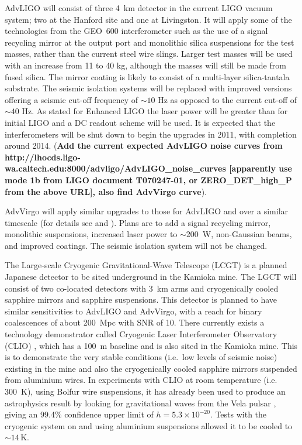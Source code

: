 \documentclass{article}
\begin{document}
AdvLIGO will consist of three 4~km detector in the current LIGO vacuum system;
two at the Hanford site and one at Livingston. It will apply some of the
technologies from the GEO~600 interferometer such as the use of a signal
recycling mirror at the output port and monolithic silica suspensions for the
test masses, rather than the current steel wire slings. Larger test masses will
be used with an increase from 11 to 40 kg, although the masses will still be
made from fused silica. The mirror coating is likely to consist of a
multi-layer silica-tantala substrate. The seismic isolation systems will be
replaced with improved versions offering a seismic cut-off frequency of $\sim10$
Hz as opposed to the current cut-off of $\sim40$ Hz. As stated for Enhanced LIGO
the laser power will be greater than for initial LIGO and a DC readout scheme
will be used. It is expected that the interferometers will be shut down to
begin the upgrades in 2011, with completion around 2014. ({\bf Add the current
expected AdvLIGO noise curves from
http://lhocds.ligo-wa.caltech.edu:8000/advligo/AdvLIGO\_noise\_curves
[apparently
use mode 1b from LIGO document T070247-01, or ZERO\_DET\_high\_P from the above
URL], also find AdvVirgo curve}).

AdvVirgo will apply similar upgrades to those for AdvLIGO and over a similar
timescale (for details see \cite{AdVwhitepaper} and \cite{AdVdesign}). Plans are
to add a signal recycling mirror, monolithic suspensions, increased laser power
to $\sim200$~W, non-Gaussian beams, and improved coatings. The seismic isolation
system will not be changed.

The Large-scale Cryogenic Gravitational-Wave Telescope (LCGT)
\cite{Miyoki:2005, Ohashi:2008} is a planned Japanese detector to be sited
underground in the Kamioka mine. The LGCT will consist of two co-located
detectors with 3~km arms and cryogenically cooled sapphire mirrors and sapphire
suspensions. This detector is planned to have similar sensitivities to AdvLIGO
and AdvVirgo, with a reach for binary coalescences of about 200~Mpc with SNR of
10. There currently exists a technology demonstrator called Cryogenic Laser
Interferometer Observatory (CLIO) \cite{Yamamoto:2008, CLIOweb}, which has a
100~m baseline and is also sited in the Kamioka mine. This is to demonstrate the
very stable conditions (i.e.\ low levels of seismic noise) existing in the mine
and also the cryogenically cooled sapphire mirrors suspended from aluminium
wires. In experiments with CLIO at room temperature (i.e. 300~K), using Bolfur 
wire suspensions, it has already been used to produce an astrophysics result by
looking for gravitational waves from the Vela pulsar \cite{Akutsu:2008}, giving
an 99.4\% confidence upper limit of $h = 5.3\times10^{-20}$. Tests with the
cryogenic system on and using aluminium suspensions allowed it to be cooled to
$\sim14$\,K.
\end{document}
